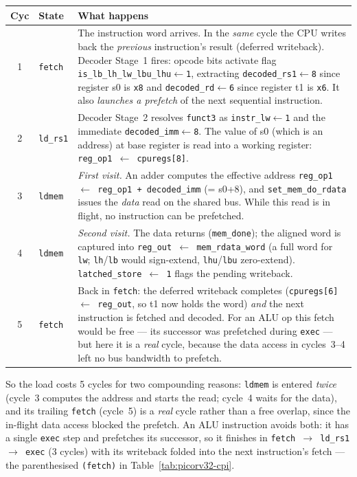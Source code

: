 \documentclass[9pt, a4paper]{extarticle}
\begin{document}
\begin{center}\small
\renewcommand{\arraystretch}{1.35}
\begin{tabular}{@{}c l p{9.5cm}@{}}
    \toprule
    Cyc & State & What happens \\
    \midrule
    1 & \texttt{fetch} &
        The instruction word arrives. In the \emph{same} cycle the CPU writes back the \emph{previous} instruction's result (deferred writeback). Decoder Stage~1 fires: opcode bits activate flag \texttt{is\_lb\_lh\_lw\_lbu\_lhu$\gets$1}, extracting \texttt{decoded\_rs1$\gets$8} since register s0 is \texttt{x8} and \texttt{decoded\_rd$\gets$6} since register t1 is \texttt{x6}. It also \emph{launches a prefetch} of the next sequential instruction. \\
    \midrule
    2 & \texttt{ld\_rs1} &
        Decoder Stage~2 resolves \texttt{funct3} as \texttt{instr\_lw$\gets$1} and the immediate \texttt{decoded\_imm$\gets$8}. The value of s0 (which is an address) at base register is read into a working register: \texttt{reg\_op1 $\leftarrow$ cpuregs[8]}. \\
    \midrule
    3 & \texttt{ldmem} &
        \emph{First visit.} An adder computes the effective address \texttt{reg\_op1 $\leftarrow$ reg\_op1 + decoded\_imm} (= s0+8), and \texttt{set\_mem\_do\_rdata} issues the \emph{data} read on the shared bus. While this read is in flight, no instruction can be prefetched. \\
    \midrule
    4 & \texttt{ldmem} &
        \emph{Second visit.} The data returns (\texttt{mem\_done}); the aligned word is captured into \texttt{reg\_out $\leftarrow$ mem\_rdata\_word} (a full word for \texttt{lw}; \texttt{lh}/\texttt{lb} would sign-extend, \texttt{lhu}/\texttt{lbu} zero-extend). \texttt{latched\_store $\leftarrow$ 1} flags the pending writeback. \\
    \midrule
    5 & \texttt{fetch} &
        Back in \texttt{fetch}: the deferred writeback completes (\texttt{cpuregs[6] $\leftarrow$ reg\_out}, so t1 now holds the word) \emph{and} the next instruction is fetched and decoded. For an ALU op this fetch would be free --- its successor was prefetched during \texttt{exec} --- but here it is a \emph{real} cycle, because the data access in cycles~3--4 left no bus bandwidth to prefetch. \\
    \bottomrule
\end{tabular}
\end{center}

So the load costs 5 cycles for two compounding reasons: \texttt{ldmem} is entered \emph{twice} (cycle~3 computes the address and starts the read; cycle~4 waits for the data), and its trailing \texttt{fetch} (cycle~5) is a \emph{real} cycle rather than a free overlap, since the in-flight data access blocked the prefetch. An ALU instruction avoids both: it has a single \texttt{exec} step and prefetches its successor, so it finishes in \texttt{fetch $\to$ ld\_rs1 $\to$ exec} (3 cycles) with its writeback folded into the next instruction's fetch --- the parenthesised \texttt{(fetch)} in Table~\ref{tab:picorv32-cpi}.
\end{document}
